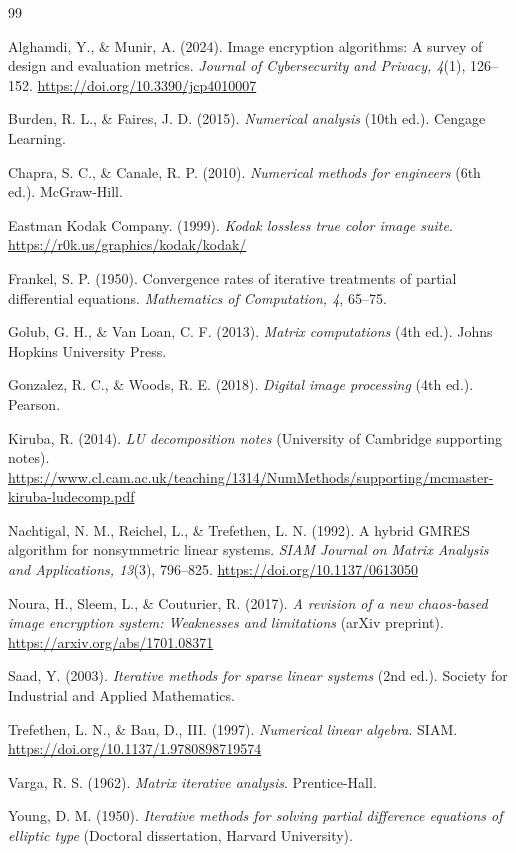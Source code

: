 \documentclass[11pt]{article}
\begin{document}
{\sloppy
\begin{thebibliography}{99}
\raggedright

Alghamdi, Y., \& Munir, A. (2024). Image encryption algorithms: A survey of design and evaluation metrics. \textit{Journal of Cybersecurity and Privacy, 4}(1), 126--152. \url{https://doi.org/10.3390/jcp4010007}

Burden, R. L., \& Faires, J. D. (2015). \textit{Numerical analysis} (10th ed.). Cengage Learning.

Chapra, S. C., \& Canale, R. P. (2010). \textit{Numerical methods for engineers} (6th ed.). McGraw-Hill.

Eastman Kodak Company. (1999). \textit{Kodak lossless true color image suite}. \url{https://r0k.us/graphics/kodak/kodak/}

Frankel, S. P. (1950). Convergence rates of iterative treatments of partial differential equations. \textit{Mathematics of Computation, 4}, 65--75.

Golub, G. H., \& Van Loan, C. F. (2013). \textit{Matrix computations} (4th ed.). Johns Hopkins University Press.

Gonzalez, R. C., \& Woods, R. E. (2018). \textit{Digital image processing} (4th ed.). Pearson.

Kiruba, R. (2014). \textit{LU decomposition notes} (University of Cambridge supporting notes).
\newline\url{https://www.cl.cam.ac.uk/teaching/1314/NumMethods/supporting/mcmaster-kiruba-ludecomp.pdf}

Nachtigal, N. M., Reichel, L., \& Trefethen, L. N. (1992). A hybrid GMRES algorithm for nonsymmetric linear systems. \textit{SIAM Journal on Matrix Analysis and Applications, 13}(3), 796--825. \url{https://doi.org/10.1137/0613050}

Noura, H., Sleem, L., \& Couturier, R. (2017). \textit{A revision of a new chaos-based image encryption system: Weaknesses and limitations} (arXiv preprint). \url{https://arxiv.org/abs/1701.08371}

Saad, Y. (2003). \textit{Iterative methods for sparse linear systems} (2nd ed.). Society for Industrial and Applied Mathematics.

Trefethen, L. N., \& Bau, D., III. (1997). \textit{Numerical linear algebra}. SIAM. \url{https://doi.org/10.1137/1.9780898719574}

Varga, R. S. (1962). \textit{Matrix iterative analysis}. Prentice-Hall.

Young, D. M. (1950). \textit{Iterative methods for solving partial difference equations of elliptic type} (Doctoral dissertation, Harvard University).

\end{thebibliography}
}
\end{document}
